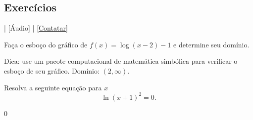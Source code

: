 \subsection*{Exercícios}

\begin{flushright}
  [Vídeo] | [Áudio] | \href{https://phkonzen.github.io/notas/contato.html}{[Contatar]}
\end{flushright}

\begin{exer}
  Faça o esboço do gráfico de $f(x) = \log(x-2)-1$ e determine seu domínio.
\end{exer}
\begin{resp}
  Dica: use um pacote computacional de matemática simbólica para verificar o esboço de seu gráfico. Domínio: $(2, \infty)$.
\end{resp}

\begin{exer}
  Resolva a seguinte equação para $x$
  \begin{equation}
    \ln(x+1)^2=0.
  \end{equation}
\end{exer}
\begin{resp}
  $0$
\end{resp}
